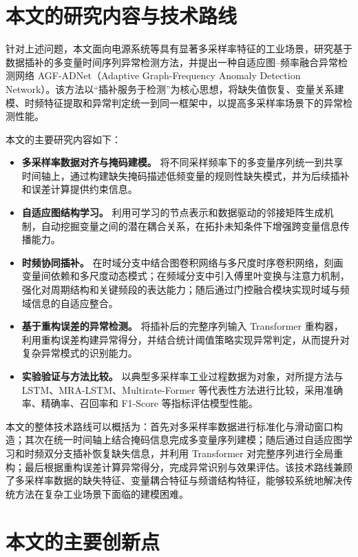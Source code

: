\section{本文的研究内容与技术路线}

针对上述问题，本文面向电源系统等具有显著多采样率特征的工业场景，研究基于数据插补的多变量时间序列异常检测方法，并提出一种自适应图--频率融合异常检测网络 AGF-ADNet（Adaptive Graph-Frequency Anomaly Detection Network）。该方法以``插补服务于检测''为核心思想，将缺失值恢复、变量关系建模、时频特征提取和异常判定统一到同一框架中，以提高多采样率场景下的异常检测性能。

本文的主要研究内容如下：

\begin{itemize}
    \item \textbf{多采样率数据对齐与掩码建模。} 将不同采样频率下的多变量序列统一到共享时间轴上，通过构建缺失掩码描述低频变量的规则性缺失模式，并为后续插补和误差计算提供约束信息。
    \item \textbf{自适应图结构学习。} 利用可学习的节点表示和数据驱动的邻接矩阵生成机制，自动挖掘变量之间的潜在耦合关系，在拓扑未知条件下增强跨变量信息传播能力。
    \item \textbf{时频协同插补。} 在时域分支中结合图卷积网络与多尺度时序卷积网络，刻画变量间依赖和多尺度动态模式；在频域分支中引入傅里叶变换与注意力机制，强化对周期结构和关键频段的表达能力；随后通过门控融合模块实现时域与频域信息的自适应整合。
    \item \textbf{基于重构误差的异常检测。} 将插补后的完整序列输入 Transformer 重构器，利用重构误差构建异常得分，并结合统计阈值策略实现异常判定，从而提升对复杂异常模式的识别能力。
    \item \textbf{实验验证与方法比较。} 以典型多采样率工业过程数据为对象，对所提方法与 LSTM、MRA-LSTM、Multirate-Former 等代表性方法进行比较，采用准确率、精确率、召回率和 F1-Score 等指标评估模型性能。
\end{itemize}

本文的整体技术路线可以概括为：首先对多采样率数据进行标准化与滑动窗口构造；其次在统一时间轴上结合掩码信息完成多变量序列建模；随后通过自适应图学习和时频双分支插补恢复缺失信息，并利用 Transformer 对完整序列进行全局重构；最后根据重构误差计算异常得分，完成异常识别与效果评估。该技术路线兼顾了多采样率数据的缺失特征、变量耦合特征与频谱结构特征，能够较系统地解决传统方法在复杂工业场景下面临的建模困难。

\section{本文的主要创新点}

